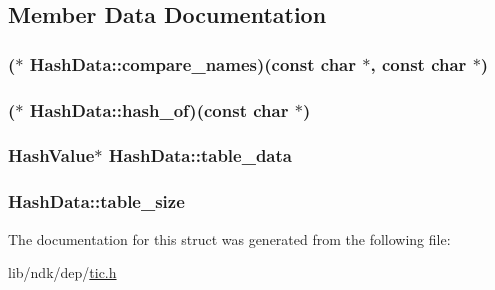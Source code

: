 \subsection{Member Data Documentation}
\hypertarget{struct_hash_data_a8651098b6100a9bb85073a326e629606}{
\subsubsection[{compare\-\_\-names}]{($\ast$ Hash\-Data\-::compare\-\_\-names)({\bf const} char $\ast$, {\bf const} char $\ast$)}}\label{struct_hash_data_a8651098b6100a9bb85073a326e629606}
\hypertarget{struct_hash_data_aa5fc2114a16c367da9c4e0471cef1103}{
\subsubsection[{hash\-\_\-of}]{($\ast$ Hash\-Data\-::hash\-\_\-of)({\bf const} char $\ast$)}}\label{struct_hash_data_aa5fc2114a16c367da9c4e0471cef1103}
\hypertarget{struct_hash_data_a254c48901309fab4a2ef74a51e433081}{
\subsubsection[{table\-\_\-data}]{ {\bf Hash\-Value}$\ast$ Hash\-Data\-::table\-\_\-data}}\label{struct_hash_data_a254c48901309fab4a2ef74a51e433081}
\hypertarget{struct_hash_data_a19ecb4447ad3d32cb95d5654cd02eb95}{
\subsubsection[{table\-\_\-size}]{ Hash\-Data\-::table\-\_\-size}}\label{struct_hash_data_a19ecb4447ad3d32cb95d5654cd02eb95}


The documentation for this struct was generated from the following file\-:\begin{DoxyCompactItemize}
\item 
lib/ndk/dep/\hyperlink{tic_8h}{tic.\-h}\end{DoxyCompactItemize}
